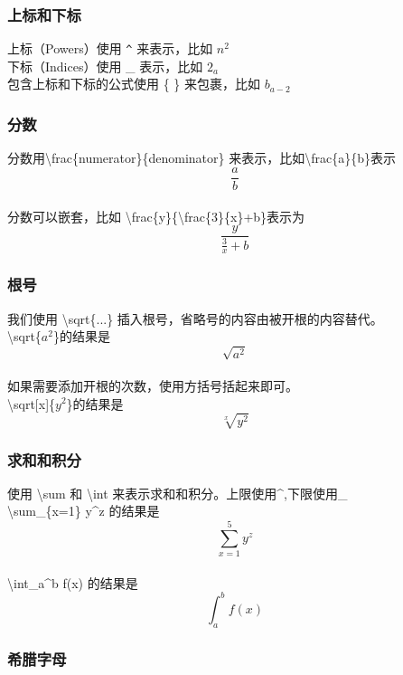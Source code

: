 \documentclass[a4paper,12pt]{article}
\begin{document}
            \subsubsection{上标和下标}

            上标（Powers）使用 \texttt{\^} 来表示，比如 $n^2$
            \\ \indent 下标（Indices）使用 \_ 表示，比如 $2_{a}$
            \\ \indent  包含上标和下标的公式使用 \{ \} 来包裹，比如 $b_{a-2}$
        
            \subsubsection{分数}
            分数用\textbackslash frac\{numerator\}\{denominator\} 来表示，比如\textbackslash frac\{a\}\{b\}表示 $$\frac{a}{b}$$
            \\分数可以嵌套，比如 \textbackslash frac\{y\}\{\textbackslash frac\{3\}\{x\}+b\}表示为$$\frac{y}{\frac{3}{x}+b}$$
        
            \subsubsection{根号}

            我们使用 \textbackslash sqrt\{...\} 插入根号，省略号的内容由被开根的内容替代。
            \\ \textbackslash sqrt\{$a^2$\}的结果是 $$\sqrt{a^2}$$
            \\  \indent 如果需要添加开根的次数，使用方括号括起来即可。
            \\ \textbackslash sqrt[x]\{$y^2$\}的结果是 $$\sqrt[x]{y^2}$$
        
            \subsubsection{求和和积分}
             
            使用 \textbackslash sum 和 \textbackslash int 来表示求和和积分。上限使用\^{},下限使用\_{}
            \\ \textbackslash sum\_\{x=1\} y\^{}z 的结果是 $$\sum_{x=1}^5 y^z$$
            \\ \textbackslash int\_a\^{}b f(x) 的结果是 $$\int_a^b f(x)$$

            \subsubsection{希腊字母}
           
\end{document}
